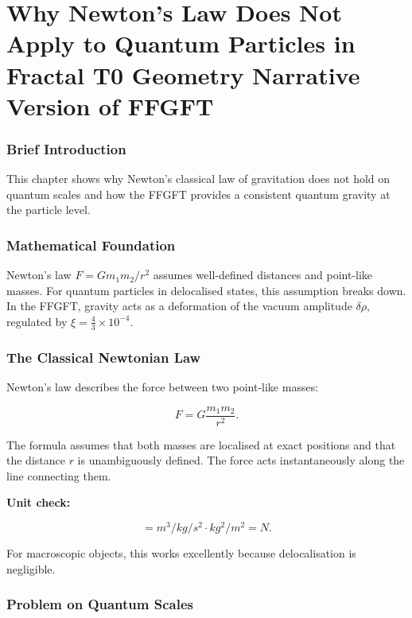 \chapter{Why Newton's Law Does Not Apply to Quantum Particles in Fractal T0 Geometry  Narrative Version of FFGFT}


	
	\subsection*{Brief Introduction}
	
	This chapter shows why Newton's classical law of gravitation does not hold on quantum scales and how the FFGFT provides a consistent quantum gravity at the particle level.
	
	\subsection*{Mathematical Foundation}
	
	Newton's law \(F = G m_1 m_2 / r^2\) assumes well-defined distances and point-like masses. For quantum particles in delocalised states, this assumption breaks down. In the FFGFT, gravity acts as a deformation of the vacuum amplitude \(\delta \rho\), regulated by \(\xi = \frac{4}{3} \times 10^{-4}\).
	
	\subsection*{The Classical Newtonian Law}
	
	Newton's law describes the force between two point-like masses:
	
	\begin{equation}
		F = G \frac{m_1 m_2}{r^2}.
	\end{equation}
	
	The formula assumes that both masses are localised at exact positions and that the distance \(r\) is unambiguously defined. The force acts instantaneously along the line connecting them.
	
	\textbf{Unit check:}
	
	\begin{equation}
		[F] = \si{m^{3}/kg/s^{2}} \cdot \si{kg^{2}} / \si{m^{2}} = \si{N}.
	\end{equation}
	
	For macroscopic objects, this works excellently because delocalisation is negligible.
	
	\subsection*{Problem on Quantum Scales}
	
